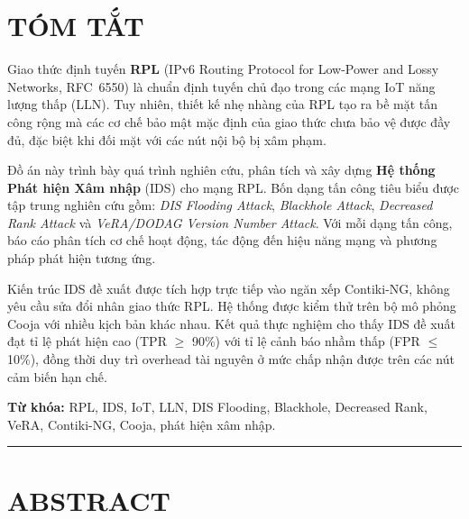 \section*{TÓM TẮT}
{}
\thispagestyle{empty}

Giao thức định tuyến \textbf{RPL} (IPv6 Routing Protocol for Low-Power and
Lossy Networks, RFC~6550) là chuẩn định tuyến chủ đạo trong các mạng IoT
năng lượng thấp (LLN). Tuy nhiên, thiết kế nhẹ nhàng của RPL tạo ra bề mặt
tấn công rộng mà các cơ chế bảo mật mặc định của giao thức chưa bảo vệ
được đầy đủ, đặc biệt khi đối mặt với các nút nội bộ bị xâm phạm.

Đồ án này trình bày quá trình nghiên cứu, phân tích và xây dựng \textbf{Hệ
thống Phát hiện Xâm nhập} (IDS) cho mạng RPL. Bốn dạng tấn công tiêu biểu
được tập trung nghiên cứu gồm: \textit{DIS Flooding Attack},
\textit{Blackhole Attack}, \textit{Decreased Rank Attack} và
\textit{VeRA/DODAG Version Number Attack}. Với mỗi dạng tấn công, báo cáo
phân tích cơ chế hoạt động, tác động đến hiệu năng mạng và phương pháp phát
hiện tương ứng.

Kiến trúc IDS đề xuất được tích hợp trực tiếp vào ngăn xếp Contiki-NG,
không yêu cầu sửa đổi nhân giao thức RPL. Hệ thống được kiểm thử trên bộ
mô phỏng Cooja với nhiều kịch bản khác nhau. Kết quả thực nghiệm cho thấy
IDS đề xuất đạt tỉ lệ phát hiện cao (TPR $\geq$ 90\%) với tỉ lệ cảnh báo
nhầm thấp (FPR $\leq$ 10\%), đồng thời duy trì overhead tài nguyên ở mức
chấp nhận được trên các nút cảm biến hạn chế.

\vspace{0.5cm}
\noindent\textbf{Từ khóa:} RPL, IDS, IoT, LLN, DIS Flooding, Blackhole,
Decreased Rank, VeRA, Contiki-NG, Cooja, phát hiện xâm nhập.

\vspace{1.5cm}
\begin{center}
  \rule{0.5\textwidth}{0.4pt}
\end{center}
\vspace{1cm}

\section*{ABSTRACT}
{}

